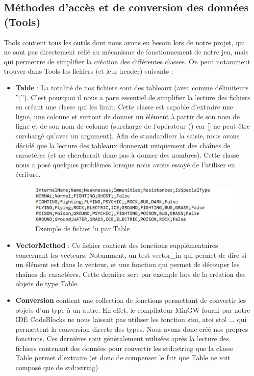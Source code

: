 \subsection{Méthodes d'accès et de conversion des données (Tools)}
Tools contient tous les outils dont nous avons eu besoin lors de notre projet, qui ne sont pas directement relié au mécanisme de fonctionnement de notre jeu, mais qui permettre de simplifier la création des différentes classes. On peut notamment trouver dans Tools les fichiers (et leur header) suivants :

\begin{itemize}
\item \textbf{Table }: La totalité de nos fichiers sont des tableaux (avec comme délimiteurs '';''). C'est pourquoi il nous a paru essentiel de simplifier la lecture des fichiers en créant une classe qui les lirait. Cette classe est capable d'extraire une ligne, une colonne et surtout de donner un élément à partir de son nom de ligne et de son nom de colonne (surcharge de l'opérateur () car [] ne peut être surchargé qu'avec un argument). Afin de standardiser la saisie, nous avons décidé que la lecture des tableaux donnerait uniquement des chaînes de caractères (et ne chercherait donc pas à donner des nombres). Cette classe nous a posé quelques problèmes lorsque nous avons essayé de l'utiliser en écriture.

\begin{figure}[!h]\centering
\includegraphics[scale = 0.84]{../Images/fichierTexteExemple.jpg}
\caption{Exemple de fichier lu par Table}
\end{figure}

\item \textbf{VectorMethod} : Ce fichier contient des fonctions supplémentaires concernant les vecteurs. Notamment, un test vector\_in qui permet de dire si un élément est dans le vecteur, et une fonction qui permet de découper les chaînes de caractères. Cette dernière sert par exemple lors de la création des objets de type Table. 
\item \textbf{Conversion} contient une collection de fonctions permettant de convertir les objets d'un type à un autre. En effet, le compilateur MinGW fourni par notre IDE CodeBlocks ne nous laissait pas utiliser les fonction stoi, atoi stol ... qui permettent la conversion directe des types. Nous avons donc créé nos propres fonctions. Ces dernières sont généralement utilisées après la lecture des fichiers contenant des données pour convertir les std::string que la classe Table permet d'extraire (et donc de compenser le fait que Table ne soit composé que de std::string)


\end{itemize}
